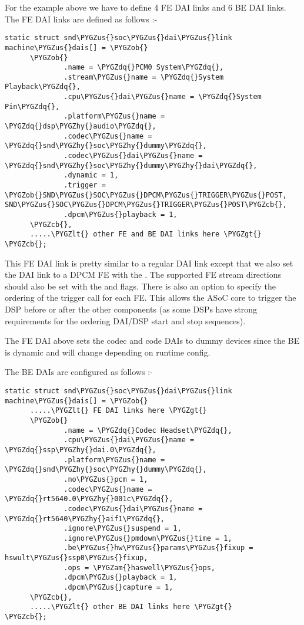 \documentclass[a4paper,8pt,english]{sphinxmanual}
\def\PYGZus{\char`\_}
\def\PYGZob{\char`\{}
\def\PYGZcb{\char`\}}
\def\PYGZam{\char`\&}
\def\PYGZlt{\char`\<}
\def\PYGZgt{\char`\>}
\def\PYGZhy{\char`\-}
\def\PYGZdq{\char`\"}
\begin{document}
For the example above we have to define 4 FE DAI links and 6 BE DAI links. The
FE DAI links are defined as follows :-

\begin{Verbatim}[commandchars=\\\{\}]
static struct snd\PYGZus{}soc\PYGZus{}dai\PYGZus{}link machine\PYGZus{}dais[] = \PYGZob{}
      \PYGZob{}
              .name = \PYGZdq{}PCM0 System\PYGZdq{},
              .stream\PYGZus{}name = \PYGZdq{}System Playback\PYGZdq{},
              .cpu\PYGZus{}dai\PYGZus{}name = \PYGZdq{}System Pin\PYGZdq{},
              .platform\PYGZus{}name = \PYGZdq{}dsp\PYGZhy{}audio\PYGZdq{},
              .codec\PYGZus{}name = \PYGZdq{}snd\PYGZhy{}soc\PYGZhy{}dummy\PYGZdq{},
              .codec\PYGZus{}dai\PYGZus{}name = \PYGZdq{}snd\PYGZhy{}soc\PYGZhy{}dummy\PYGZhy{}dai\PYGZdq{},
              .dynamic = 1,
              .trigger = \PYGZob{}SND\PYGZus{}SOC\PYGZus{}DPCM\PYGZus{}TRIGGER\PYGZus{}POST, SND\PYGZus{}SOC\PYGZus{}DPCM\PYGZus{}TRIGGER\PYGZus{}POST\PYGZcb{},
              .dpcm\PYGZus{}playback = 1,
      \PYGZcb{},
      .....\PYGZlt{} other FE and BE DAI links here \PYGZgt{}
\PYGZcb{};
\end{Verbatim}

This FE DAI link is pretty similar to a regular DAI link except that we also
set the DAI link to a DPCM FE with the . The supported FE stream
directions should also be set with the  and 
flags. There is also an option to specify the ordering of the trigger call for
each FE. This allows the ASoC core to trigger the DSP before or after the other
components (as some DSPs have strong requirements for the ordering DAI/DSP
start and stop sequences).

The FE DAI above sets the codec and code DAIs to dummy devices since the BE is
dynamic and will change depending on runtime config.

The BE DAIs are configured as follows :-

\begin{Verbatim}[commandchars=\\\{\}]
static struct snd\PYGZus{}soc\PYGZus{}dai\PYGZus{}link machine\PYGZus{}dais[] = \PYGZob{}
      .....\PYGZlt{} FE DAI links here \PYGZgt{}
      \PYGZob{}
              .name = \PYGZdq{}Codec Headset\PYGZdq{},
              .cpu\PYGZus{}dai\PYGZus{}name = \PYGZdq{}ssp\PYGZhy{}dai.0\PYGZdq{},
              .platform\PYGZus{}name = \PYGZdq{}snd\PYGZhy{}soc\PYGZhy{}dummy\PYGZdq{},
              .no\PYGZus{}pcm = 1,
              .codec\PYGZus{}name = \PYGZdq{}rt5640.0\PYGZhy{}001c\PYGZdq{},
              .codec\PYGZus{}dai\PYGZus{}name = \PYGZdq{}rt5640\PYGZhy{}aif1\PYGZdq{},
              .ignore\PYGZus{}suspend = 1,
              .ignore\PYGZus{}pmdown\PYGZus{}time = 1,
              .be\PYGZus{}hw\PYGZus{}params\PYGZus{}fixup = hswult\PYGZus{}ssp0\PYGZus{}fixup,
              .ops = \PYGZam{}haswell\PYGZus{}ops,
              .dpcm\PYGZus{}playback = 1,
              .dpcm\PYGZus{}capture = 1,
      \PYGZcb{},
      .....\PYGZlt{} other BE DAI links here \PYGZgt{}
\PYGZcb{};
\end{Verbatim}
\end{document}
